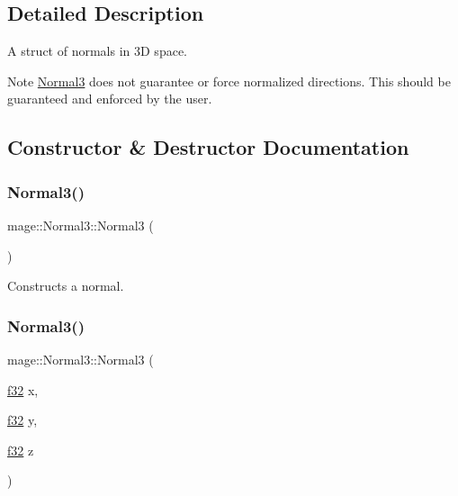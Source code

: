 \subsection{Detailed Description}
A struct of normals in 3D space.

\begin{DoxyNote}{Note}
{\ttfamily \hyperlink{structmage_1_1_normal3}{Normal3}} does not guarantee or force normalized directions. This should be guaranteed and enforced by the user. 
\end{DoxyNote}


\subsection{Constructor \& Destructor Documentation}
\hypertarget{structmage_1_1_normal3_a64a99fa013aff357da71a39f1957e7c6}{}\label{structmage_1_1_normal3_a64a99fa013aff357da71a39f1957e7c6} 
\subsubsection{\texorpdfstring{Normal3()}{Normal3()}\hspace{0.1cm}{\footnotesize\ttfamily [1/8]}}
{\footnotesize\ttfamily mage\+::\+Normal3\+::\+Normal3 (\begin{DoxyParamCaption}{ }\end{DoxyParamCaption})\hspace{0.3cm}{\ttfamily [noexcept]}}

Constructs a normal. \hypertarget{structmage_1_1_normal3_af4d0bf7f7f4fd523952e4221d96606f5}{}\label{structmage_1_1_normal3_af4d0bf7f7f4fd523952e4221d96606f5} 
\subsubsection{\texorpdfstring{Normal3()}{Normal3()}\hspace{0.1cm}{\footnotesize\ttfamily [2/8]}}
{\footnotesize\ttfamily mage\+::\+Normal3\+::\+Normal3 (\begin{DoxyParamCaption}\item[{\hyperlink{namespacemage_a6a44ad388483959dc4dff9f2aef91431}{f32}}]{x,  }\item[{\hyperlink{namespacemage_a6a44ad388483959dc4dff9f2aef91431}{f32}}]{y,  }\item[{\hyperlink{namespacemage_a6a44ad388483959dc4dff9f2aef91431}{f32}}]{z }\end{DoxyParamCaption})\hspace{0.3cm}{\ttfamily [noexcept]}}

